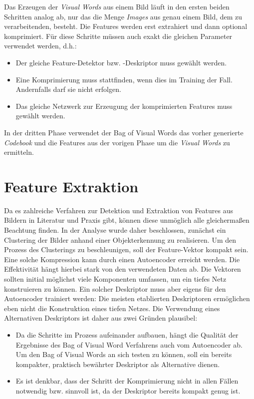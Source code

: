 Das Erzeugen der \textit{Visual Words} aus einem Bild läuft in den ersten beiden Schritten analog ab, nur das die Menge \textit{Images} aus genau einem Bild, dem zu verarbeitenden, besteht. Die Features werden erst extrahiert und dann optional komprimiert. Für diese Schritte müssen auch exakt die gleichen Parameter verwendet werden, d.h.:

\begin{itemize}
	\item Der gleiche Feature-Detektor bzw. -Deskriptor muss gewählt werden.
	\item Eine Komprimierung muss stattfinden, wenn dies im Training der Fall. Andernfalls darf sie nicht erfolgen.
	\item Das gleiche Netzwerk zur Erzeugung der komprimierten Features muss gewählt werden.
\end{itemize}

In der dritten Phase verwendet der Bag of Visual Words das vorher generierte \textit{Codebook} und die Features aus der vorigen Phase um die \textit{Visual Words} zu ermitteln.

\section{Feature Extraktion}

Da es zahlreiche Verfahren zur Detektion und Extraktion von Features aus Bildern in Literatur und Praxis gibt, können diese unmöglich alle gleichermaßen Beachtung finden. In der Analyse wurde daher beschlossen, zunächst ein Clustering der Bilder anhand einer Objekterkennung zu realisieren. Um den Prozess des Clusterings zu beschleunigen, soll der Feature-Vektor kompakt sein. Eine solche Kompression kann durch einen Autoencoder erreicht werden. Die Effektivität hängt hierbei stark von den verwendeten Daten ab. Die Vektoren sollten initial möglichst viele Komponenten umfassen, um ein tiefes Netz konstruieren zu können. Ein solcher Deskriptor muss aber eigens für den Autoencoder trainiert werden: Die meisten etablierten Deskriptoren ermöglichen eben nicht die Konstruktion eines tiefen Netzes. Die Verwendung eines Alternativen Deskriptors ist daher aus zwei Gründen plausibel:

\begin{itemize}
	\item Da die Schritte im Prozess aufeinander aufbauen, hängt die Qualität der Ergebnisse des Bag of Visual Word Verfahrens auch vom Autoencoder ab. Um den Bag of Visual Words an sich testen zu können, soll ein bereits kompakter, praktisch bewährter Deskriptor als Alternative dienen.
	\item Es ist denkbar, dass der Schritt der Komprimierung nicht in allen Fällen notwendig bzw. sinnvoll ist, da der Deskriptor bereits kompakt genug ist.
\end{itemize} 

